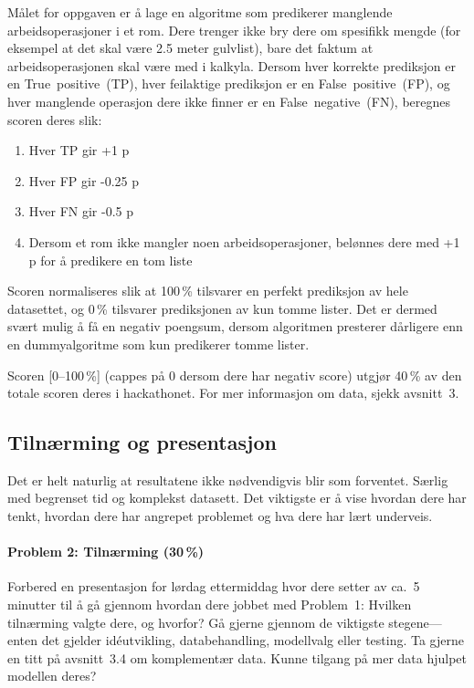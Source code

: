 \documentclass[a4paper]{article}
\begin{document}
Målet for oppgaven er å lage en algoritme som predikerer manglende arbeidsoperasjoner i et rom. Dere trenger ikke bry dere om spesifikk mengde (for eksempel at det skal være 2.5 meter gulvlist), bare det faktum at arbeidsoperasjonen skal være med i kalkyla. Dersom hver korrekte prediksjon er en True~positive~(TP), hver feilaktige prediksjon er en False~positive~(FP), og hver manglende operasjon dere ikke finner er en False~negative~(FN), beregnes scoren deres slik:
\begin{enumerate}
\item Hver TP gir +1 p
\item Hver FP gir -0.25 p
\item Hver FN gir -0.5 p
\item Dersom et rom ikke mangler noen arbeidsoperasjoner, belønnes dere med +1 p for å predikere en tom liste
\end{enumerate}

Scoren normaliseres slik at 100\,\% tilsvarer en perfekt prediksjon av hele datasettet, og 0\,\% tilsvarer prediksjonen av kun tomme lister. Det er dermed svært mulig å få en negativ poengsum, dersom algoritmen presterer dårligere enn en dummyalgoritme som kun predikerer tomme lister. 

Scoren [0--100\,\%] (cappes på 0 dersom dere har negativ score) utgjør 40\,\% av den totale scoren deres i hackathonet. For mer informasjon om data, sjekk avsnitt~3.

\subsection{Tilnærming og presentasjon}
Det er helt naturlig at resultatene ikke nødvendigvis blir som forventet. Særlig med begrenset tid og komplekst datasett. Det viktigste er å vise hvordan dere har tenkt, hvordan dere har angrepet problemet og hva dere har lært underveis.

\paragraph{Problem 2: Tilnærming (30\,\%)}
Forbered en presentasjon for lørdag ettermiddag hvor dere setter av ca.\ 5 minutter til å gå gjennom hvordan dere jobbet med Problem~1: Hvilken tilnærming valgte dere, og hvorfor? Gå gjerne gjennom de viktigste stegene---enten det gjelder idéutvikling, databehandling, modellvalg eller testing. Ta gjerne en titt på avsnitt~3.4 om komplementær data. Kunne tilgang på mer data hjulpet modellen deres?
\end{document}
